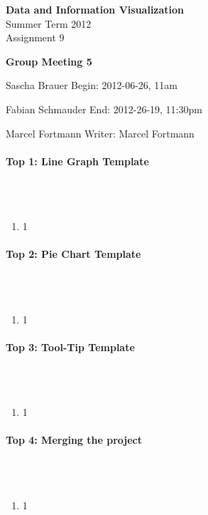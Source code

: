 \documentclass{scrartcl}
\begin{document}
\begin{center}
{\huge \textbf{Data and Information Visualization}}\\
Summer Term 2012\\
Assignment 9
\end{center}

\begin{center}
{\huge \textbf{Group Meeting 5}}\\
\end{center}
\begin{description}
\item Sascha Brauer \hfill Begin: 2012-06-26, 11am 
\item Fabian Schmauder \hfill End: 2012-26-19, 11:30pm
\item Marcel Fortmann \hfill Writer: Marcel Fortmann
\end{description}

\paragraph{Top 1: Line Graph Template}
\hfill \\ \hfill \\
\begin {enumerate}
\item 1
\end {enumerate}

\paragraph{Top 2: Pie Chart Template}
\hfill \\ \hfill \\
\begin {enumerate}
\item 1
\end {enumerate}

\paragraph{Top 3: Tool-Tip Template}
\hfill \\ \hfill \\
\begin {enumerate}
\item 1
\end {enumerate}

\paragraph{Top 4: Merging the project}
\hfill \\ \hfill \\
\begin {enumerate}
\item 1
\end {enumerate}
\end{document}
